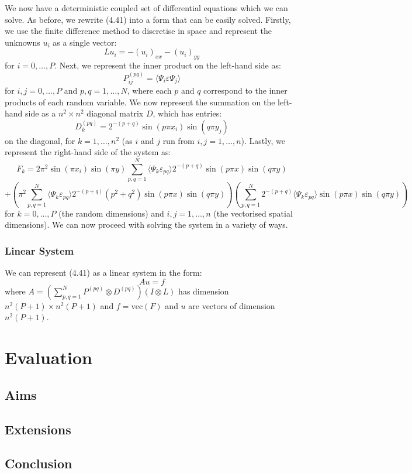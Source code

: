 \documentclass[11pt]{article}
\numberwithin{equation}{section}
\begin{document}
We now have a deterministic coupled set of differential equations which we can solve. As before, we rewrite (4.41) into a form that can be easily solved. Firstly, we use the finite difference method to discretise in space and represent the unknowns $u_i$ as a single vector:
\begin{equation}
Lu_i = - (u_i)_{xx} - (u_i)_{yy}
\end{equation}
for $i=0,\dots,P$. Next, we represent the inner product on the left-hand side as:
\begin{equation}
P_{ij}^{(pq)} = \langle \Psi_i \varepsilon \Psi_j \rangle
\end{equation}
for $i,j=0,\dots,P$ and $p,q=1,\dots,N$, where each $p$ and $q$ correspond to the inner products of each random variable. We now represent the summation on the left-hand side as a $n^2 \times n^2$ diagonal matrix $D$, which has entries:
\begin{equation}
D_k^{(pq)} = 2^{-(p+q)} \sin(p \pi x_i) \sin(q \pi y_j)
\end{equation}
on the diagonal, for $k=1,\dots,n^2$ (as $i$ and $j$ run from $i,j=1,\dots,n$). Lastly, we represent the right-hand side of the system as:
\begin{equation}
F_k = 2 \pi^2 \sin(\pi x_i) \sin(\pi y) \sum_{p,q=1}^N \langle \Psi_k \varepsilon_{pq} \rangle 2^{-(p+q)} \sin(p \pi x)\sin(q \pi y) \nonumber
\end{equation}
\begin{equation}
+ \left(\pi^2 \sum_{p,q=1}^N \langle \Psi_k \varepsilon_{pq} \rangle 2^{-(p+q)} (p^2 + q^2) \sin(p \pi x)\sin(q \pi y) \right) \left(\sum_{p,q=1}^N 2^{-(p+q)} \langle \Psi_k \varepsilon_{pq} \rangle \sin(p \pi x)\sin(q \pi y) \right)
\end{equation}
for $k=0,\dots,P$ (the random dimensions) and $i,j=1,\dots,n$ (the vectorised spatial dimensions). We can now proceed with solving the system in a variety of ways.

\subsubsection*{Linear System}
We can represent (4.41) as a linear system in the form:
\begin{equation}
Au = f
\end{equation}
where $A=\left( \sum_{p,q=1}^N P^{(pq)} \otimes D^{(pq)} \right) \left( I \otimes L \right)$ has dimension $n^2(P+1) \times n^2(P+1)$ and $f = \text{vec}(F)$ and $u$ are vectors of dimension $n^2(P+1)$.


\newpage

\section{Evaluation}

\subsection{Aims}

\subsection{Extensions}

\subsection{Conclusion}

\newpage



\end{document}
